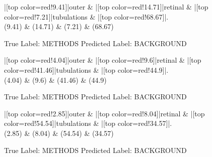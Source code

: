 \documentclass[a4paper, landscape]{article}
\begin{document}
\clearpage
\begin{figure}
\begin{center}
\begin{dependency}
\begin{deptext}
|[top color=red!9.41]|outer \& |[top color=red!14.71]|retinal \& |[top color=red!7.21]|tubulations \& |[top color=red!68.67]|.\\
(9.41) \& (14.71) \& (7.21) \& (68.67)\\
\end{deptext}
\end{dependency}
\end{center}
\caption{True Label: METHODS Predicted Label: BACKGROUND}
\end{figure}
\clearpage
\begin{figure}
\begin{center}
\begin{dependency}
\begin{deptext}
|[top color=red!4.04]|outer \& |[top color=red!9.6]|retinal \& |[top color=red!41.46]|tubulations \& |[top color=red!44.9]|.\\
(4.04) \& (9.6) \& (41.46) \& (44.9)\\
\end{deptext}
\end{dependency}
\end{center}
\caption{True Label: METHODS Predicted Label: BACKGROUND}
\end{figure}
\clearpage
\begin{figure}
\begin{center}
\begin{dependency}
\begin{deptext}
|[top color=red!2.85]|outer \& |[top color=red!8.04]|retinal \& |[top color=red!54.54]|tubulations \& |[top color=red!34.57]|.\\
(2.85) \& (8.04) \& (54.54) \& (34.57)\\
\end{deptext}
\end{dependency}
\end{center}
\caption{True Label: METHODS Predicted Label: BACKGROUND}
\end{figure}
\clearpage
\end{document}
